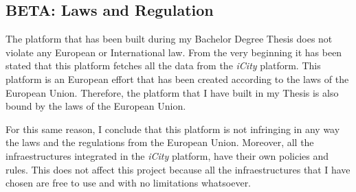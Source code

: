 
\subsection{BETA: Laws and Regulation}

The platform that has been built during my Bachelor Degree Thesis does not
violate any European or International law. From the very beginning it has been
stated that this platform fetches all the data from the {\it iCity} platform.
This platform is an European effort that has been created according to the laws
of the European Union. Therefore, the platform that I have built in my Thesis
is also bound by the laws of the European Union.

For this same reason, I conclude that this platform is not infringing in any
way the laws and the regulations from the European Union. Moreover, all the
infraestructures integrated in the {\it iCity} platform, have their own
policies and rules. This does not affect this project because all the
infraestructures that I have chosen are free to use and with no limitations
whatsoever.
